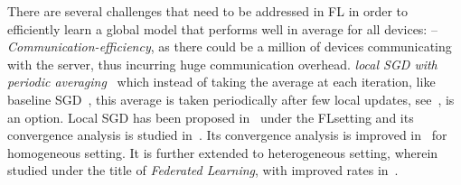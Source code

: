 \documentclass[twoside]{article}
\begin{document}
There are several challenges that need to be addressed in FL in order to efficiently learn a global model that performs well in average for all devices:
-- \emph{Communication-efficiency}, as there could be a million of devices communicating with the server, thus incurring huge communication overhead. 
 \emph{local SGD with periodic averaging}~\cite{zhou2018convergence,stich2019local,yu2019parallel,wang2018cooperative} which instead of taking the average at each iteration, like baseline SGD~\cite{bottou-bousquet-2008}, this average is taken periodically after few local updates, see~\cite{lin2019don}, is an option.
Local SGD has been proposed in~\cite{mcmahan2016communication,konevcny2016federated} under the FLsetting and its convergence analysis is studied in~\cite{zhou2018convergence,yu2019parallel,stich2019local,wang2018cooperative}. 
Its convergence analysis is improved in~\cite{haddadpour2019local,haddadpour2019trading,basu2019qsparse,haddadpour2019convergence,bayoumi2020tighter,stich2019error} for homogeneous setting. 
It is further extended to heterogeneous setting, wherein studied under the title of \emph{Federated Learning}, with improved rates in~\cite{yu2019linear,li2019convergence,sahu2018convergence,liang2019variance,haddadpour2019convergence,karimireddy2019scaffold}. 
\end{document}
